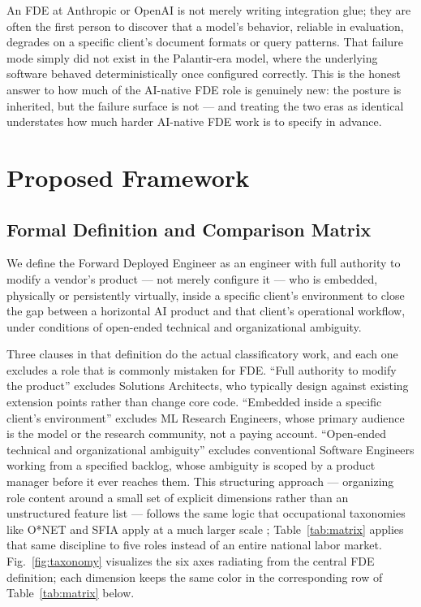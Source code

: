 \documentclass[journal]{IEEEtran}
\begin{document}
An FDE at Anthropic or OpenAI is not merely writing integration glue; they are often the first person to discover that a model's behavior, reliable in evaluation, degrades on a specific client's document formats or query patterns. That failure mode simply did not exist in the Palantir-era model, where the underlying software behaved deterministically once configured correctly. This is the honest answer to how much of the AI-native FDE role is genuinely new: the posture is inherited, but the failure surface is not --- and treating the two eras as identical understates how much harder AI-native FDE work is to specify in advance.

\section{Proposed Framework}
\label{sec:framework}

\subsection{Formal Definition and Comparison Matrix}

We define the Forward Deployed Engineer as an engineer with full authority to modify a vendor's product --- not merely configure it --- who is embedded, physically or persistently virtually, inside a specific client's environment to close the gap between a horizontal AI product and that client's operational workflow, under conditions of open-ended technical and organizational ambiguity.

Three clauses in that definition do the actual classificatory work, and each one excludes a role that is commonly mistaken for FDE. ``Full authority to modify the product'' excludes Solutions Architects, who typically design against existing extension points rather than change core code. ``Embedded inside a specific client's environment'' excludes ML Research Engineers, whose primary audience is the model or the research community, not a paying account. ``Open-ended technical and organizational ambiguity'' excludes conventional Software Engineers working from a specified backlog, whose ambiguity is scoped by a product manager before it ever reaches them. This structuring approach --- organizing role content around a small set of explicit dimensions rather than an unstructured feature list --- follows the same logic that occupational taxonomies like O*NET and SFIA apply at a much larger scale \cite{onet2024about,sfia2024framework}; Table~\ref{tab:matrix} applies that same discipline to five roles instead of an entire national labor market. Fig.~\ref{fig:taxonomy} visualizes the six axes radiating from the central FDE definition; each dimension keeps the same color in the corresponding row of Table~\ref{tab:matrix} below.
\end{document}
